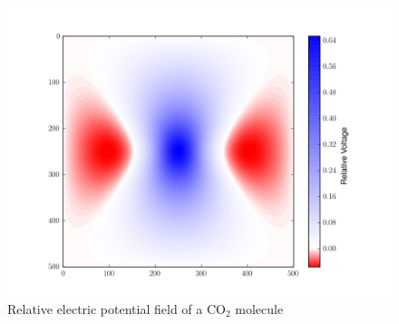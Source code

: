 \begin{figure}[ht]
\centering
\includegraphics[width=12cm]{co2V.png}
\caption{Relative electric potential field of a CO$_2$ molecule}
\label{figure4}
\end{figure}

